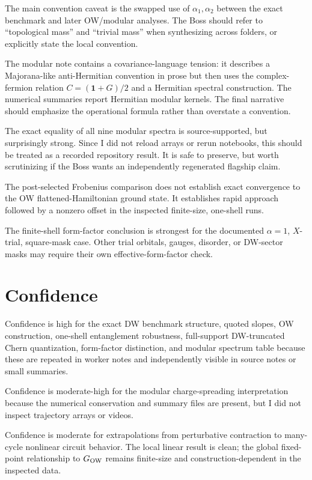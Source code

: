 \documentclass[aps,prb,onecolumn,nofootinbib,superscriptaddress]{revtex4-2}
\newcommand{\Id}{\mathbf{1}}
\newcommand{\GO}{G_{\rm OW}}
\begin{document}
The main convention caveat is the swapped use of $\alpha_1,\alpha_2$ between the exact benchmark and later OW/modular analyses.  The Boss should refer to ``topological mass'' and ``trivial mass'' when synthesizing across folders, or explicitly state the local convention.

The modular note contains a covariance-language tension: it describes a Majorana-like anti-Hermitian convention in prose but then uses the complex-fermion relation $C=(\Id+G)/2$ and a Hermitian spectral construction.  The numerical summaries report Hermitian modular kernels.  The final narrative should emphasize the operational formula rather than overstate a convention.

The exact equality of all nine modular spectra is source-supported, but surprisingly strong.  Since I did not reload arrays or rerun notebooks, this should be treated as a recorded repository result.  It is safe to preserve, but worth scrutinizing if the Boss wants an independently regenerated flagship claim.

The post-selected Frobenius comparison does not establish exact convergence to the OW flattened-Hamiltonian ground state.  It establishes rapid approach followed by a nonzero offset in the inspected finite-size, one-shell runs.

The finite-shell form-factor conclusion is strongest for the documented $\alpha=1$, $X$-trial, square-mask case.  Other trial orbitals, gauges, disorder, or DW-sector masks may require their own effective-form-factor check.

\section{Confidence}

Confidence is high for the exact DW benchmark structure, quoted slopes, OW construction, one-shell entanglement robustness, full-support DW-truncated Chern quantization, form-factor distinction, and modular spectrum table because these are repeated in worker notes and independently visible in source notes or small summaries.

Confidence is moderate-high for the modular charge-spreading interpretation because the numerical conservation and summary files are present, but I did not inspect trajectory arrays or videos.

Confidence is moderate for extrapolations from perturbative contraction to many-cycle nonlinear circuit behavior.  The local linear result is clean; the global fixed-point relationship to $\GO$ remains finite-size and construction-dependent in the inspected data.
\end{document}
